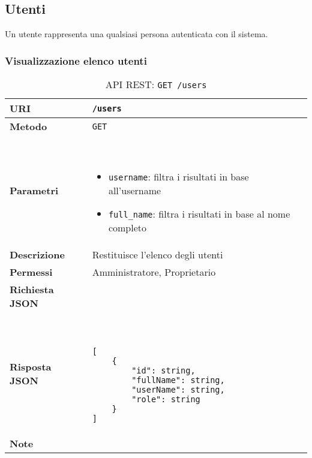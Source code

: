 \subsection{Utenti}

    Un utente rappresenta una qualsiasi persona autenticata con il sistema.

    \subsubsection{Visualizzazione elenco utenti}

        \begin{table}[H]
            \begin{center}
                \begin{tabular}{p{} p{}}
                    \toprule
                    \textbf{URI} & \texttt{/users} \\ \midrule
                    \textbf{Metodo} & \texttt{GET} \\ \midrule
                    \textbf{Parametri} & \
                        \begin{itemize}
                            \item \texttt{username}: filtra i risultati in base all'username
                            \item \texttt{full\_name}: filtra i risultati in base al nome completo
                        \end{itemize} 
                        \\ \midrule
                    \textbf{Descrizione} & Restituisce l'elenco degli utenti \\ \midrule
                    \textbf{Permessi} & Amministratore, Proprietario  \\ \midrule
                    \textbf{Richiesta JSON} & \\ \midrule
                    \textbf{Risposta JSON} & \
                        \begin{lstlisting}[basicstyle={\ttfamily}]
[
    {
        "id": string,
        "fullName": string,
        "userName": string,
        "role": string
    }
]
                        \end{lstlisting}
                        \\ \midrule
                    \textbf{Note} & \\
                    \bottomrule
                \end{tabular}
                \caption{API REST: \texttt{GET /users}}
            \end{center}
        \end{table}

